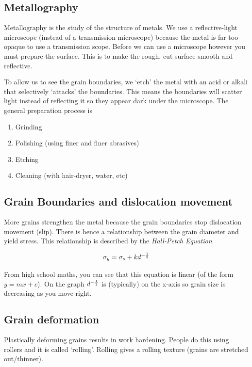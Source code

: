 \documentclass[12pt]{article}
\begin{document}
\subsection{Metallography} 
Metallography is the study of the structure of metals. 
We use a reflective-light microscope (instead of a transmission microscope) because the metal is far too opaque to use a transmission scope.
Before we can use a microscope however you must prepare the surface.
This is to make the rough, cut surface smooth and reflective.

To allow us to see the grain boundaries, we `etch' the metal with an acid or alkali that selectively `attacks' the boundaries.
This means the boundaries will scatter light instead of reflecting it so they appear dark under the microscope. 
The general preparation process is

\begin{enumerate}
  \item Grinding
  \item Polishing (using finer and finer abrasives)
  \item Etching
  \item Cleaning (with hair-dryer, water, etc)
\end{enumerate}

\subsection{Grain Boundaries and dislocation movement}
More grains strengthen the metal because the grain boundaries stop dislocation movement (slip).
There is hence a relationship between the grain diameter and yield stress. 
This relationship is described by the \textit{Hall-Petch Equation}.

\begin{equation*}
  \sigma_y = \sigma_o + kd^{-\frac{1}{2}}
\end{equation*}

From high school maths, you can see that this equation is linear (of the form $y=mx+c$).
On the graph $d^{-\frac{1}{2}}$ is (typically) on the x-axis so grain size is decreasing as you move right.

\subsection{Grain deformation}
Plastically deforming grains results in work hardening.
People do this using rollers and it is called `rolling'. 
Rolling gives a rolling texture (grains are stretched out/thinner).
\end{document}
